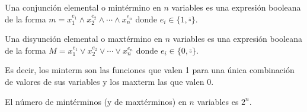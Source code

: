 \begin{ndef}[Mintérmino]
    Una conjunción elemental o mintérmino en $n$ variables es una expresión booleana de la forma $m = x_1^{e_1} \land x_2^{e_2} \land \cdots \land x_n^{e_n}$ donde $e_i \in \{1,\overline{\square}\}$.
\end{ndef}
\begin{ndef}[Maxtérmino]
    Una disyunción elemental o maxtérmino en $n$ variables es una expresión booleana de la forma $M = x_1^{e_1} \lor x_2^{e_2} \lor \cdots \lor x_n^{e_n}$ donde $e_i \in \{0,\overline{\square}\}$.
\end{ndef}
\begin{nota}
    Es decir, los minterm son las funciones que valen 1 para una única combinación de valores de sus variables y los maxterm las que valen 0.
\end{nota}
El número de mintérminos (y de maxtérminos) en $n$ variables es $2^n$.
